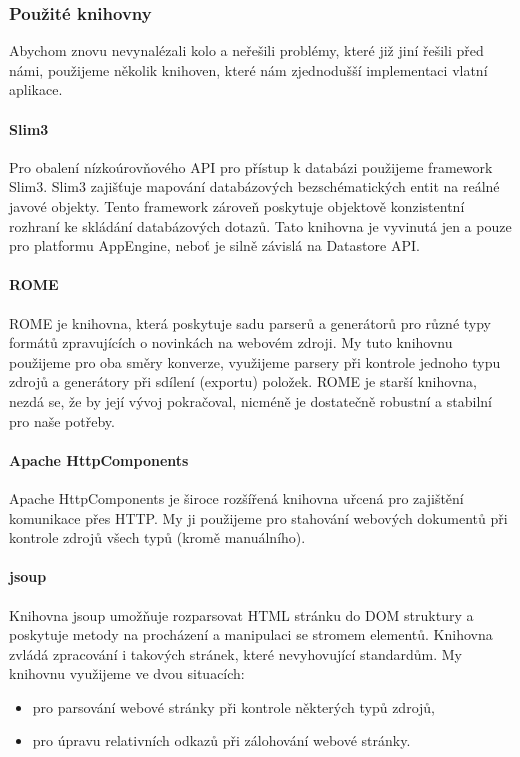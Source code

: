 \subsubsection{Použité knihovny}

Abychom znovu nevynalézali kolo a neřešili problémy, které již jiní řešili před námi, použijeme několik knihoven, které nám zjednodušší implementaci vlatní aplikace.

\paragraph{Slim3}
Pro obalení nízkoúrovňového API pro přístup k databázi použijeme framework Slim3.
Slim3 zajišťuje mapování databázových bezschématických entit na reálné javové objekty.
Tento framework zároveň poskytuje objektově konzistentní rozhraní ke skládání databázových dotazů.
Tato knihovna je vyvinutá jen a pouze pro platformu AppEngine, neboť je silně závislá na Datastore API.

\paragraph{ROME}
ROME je knihovna, která poskytuje sadu parserů a generátorů pro různé typy formátů zpravujících o novinkách na webovém zdroji.
My tuto knihovnu použijeme pro oba směry konverze, využijeme parsery při kontrole jednoho typu zdrojů a generátory při sdílení (exportu) položek.
ROME je starší knihovna, nezdá se, že by její vývoj pokračoval, nicméně je dostatečně robustní a stabilní pro naše potřeby.

\paragraph{Apache HttpComponents}
Apache HttpComponents je široce rozšířená kni\-hov\-na uřcená pro zajištění komunikace přes HTTP.
My ji použijeme pro stahování webových dokumentů při kontrole zdrojů všech typů (kromě manuálního).

\paragraph{jsoup}
Knihovna jsoup umožňuje rozparsovat HTML stránku do DOM struktury a poskytuje metody na procházení a manipulaci se stromem elementů.
Knihovna zvládá zpracování i takových stránek, které nevyhovující standardům.
My knihovnu využijeme ve dvou situacích:
\begin{itemize}
	\item pro parsování webové stránky při kontrole některých typů zdrojů,
	\item pro úpravu relativních odkazů při zálohování webové stránky.
\end{itemize}

